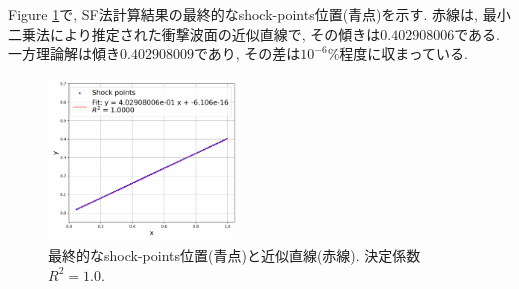 \documentclass[a4j]{jarticle}
\begin{document}
Figure \ref{fig:2Ddiagapprox}で, SF法計算結果の最終的なshock-points位置(青点)を示す.
赤線は, 最小二乗法により推定された衝撃波面の近似直線で, その傾きは$0.402908006$である.
一方理論解は傾き$0.402908009$であり, その差は$10^{-6}$\%程度に収まっている.
\begin{figure}[h]
    \centering
    \includegraphics[width=0.45\textwidth]{shock_point_approx.pdf}
    \caption{最終的なshock-points位置(青点)と近似直線(赤線). 決定係数$R^2=1.0$.}
    \label{fig:2Ddiagapprox}
\end{figure}
\end{document}
